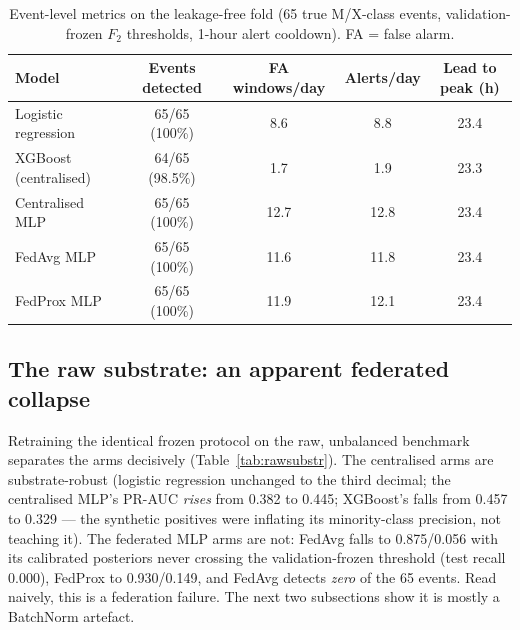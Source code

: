 \begin{table}[t]
\centering
\caption{Event-level metrics on the leakage-free fold (65 true
M/X-class events, validation-frozen $F_2$ thresholds, 1-hour alert
cooldown). FA = false alarm.}
\label{tab:eventlevel}
\small
\begin{tabular}{@{}l c c c c@{}}
\toprule
\textbf{Model} & \textbf{Events detected} & \textbf{FA windows/day} &
\textbf{Alerts/day} & \textbf{Lead to peak (h)} \\
\midrule
Logistic regression & 65/65 (100\%) & 8.6 & 8.8 & 23.4 \\
XGBoost (centralised) & 64/65 (98.5\%) & 1.7 & 1.9 & 23.3 \\
Centralised MLP & 65/65 (100\%) & 12.7 & 12.8 & 23.4 \\
FedAvg MLP & 65/65 (100\%) & 11.6 & 11.8 & 23.4 \\
FedProx MLP & 65/65 (100\%) & 11.9 & 12.1 & 23.4 \\
\bottomrule
\end{tabular}
\end{table}

\subsection{The raw substrate: an apparent federated collapse}
\label{sec:rawcollapse}

Retraining the identical frozen protocol on the raw, unbalanced
benchmark separates the arms decisively (Table~\ref{tab:rawsubstr}).
The centralised arms are substrate-robust (logistic regression
unchanged to the third decimal; the centralised MLP's PR-AUC
\emph{rises} from 0.382 to 0.445; XGBoost's falls from 0.457 to
0.329 --- the synthetic positives were inflating its minority-class
precision, not teaching it). The federated MLP arms are not: FedAvg
falls to 0.875/0.056 with its calibrated posteriors never crossing
the validation-frozen threshold (test recall 0.000), FedProx to
0.930/0.149, and FedAvg detects \emph{zero} of the 65 events. Read
naively, this is a federation failure. The next two subsections show
it is mostly a BatchNorm artefact.

